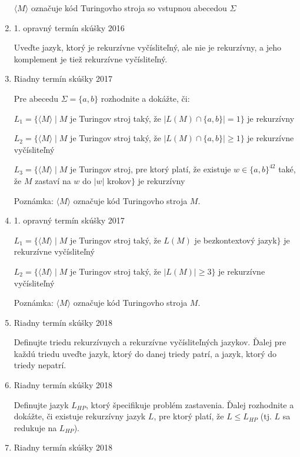 \documentclass[11pt,a4paper]{article}
\begin{document}
\begin{enumerate}
		$\langle M \rangle$ označuje kód Turingovho stroja so vstupnou abecedou $\Sigma$

		\item 1. opravný termín skúšky 2016

		Uveďte jazyk, ktorý je rekurzívne vyčísliteľný, ale nie je rekurzívny, a jeho komplement je tiež rekurzívne vyčísliteľný.

		\item Riadny termín skúšky 2017

		Pre abecedu $\Sigma = \{a, b\}$ rozhodnite a dokážte, či:

		$L_1 = \{\langle M \rangle \mid M$ je Turingov stroj taký, že $\vert L(M) \cap \{a,b\} \vert = 1\}$ je rekurzívny

		$L_2 = \{\langle M \rangle \mid M$ je Turingov stroj taký, že $\vert L(M) \cap \{a,b\} \vert \geq 1\}$ je rekurzívne vyčísliteľný

		$L_3 = \{\langle M \rangle \mid M$ je Turingov stroj, pre ktorý platí, že existuje $w \in \{a,b\}^{42}$ také, že $M$ zastaví na $w$ do $\vert w \vert$ krokov$\}$ je rekurzívny

		Poznámka: $\langle M \rangle$ označuje kód Turingovho stroja $M$.

		\item 1. opravný termín skúšky 2017

		$L_1 = \{\langle M \rangle \mid M$ je Turingov stroj taký, že $L(M)$ je bezkontextový jazyk$\}$ je rekurzívne vyčísliteľný

		$L_2 = \{\langle M \rangle \mid M$ je Turingov stroj taký, že $\vert L(M) \vert \geq 3\}$ je rekurzívne vyčísliteľný

		Poznámka: $\langle M \rangle$ označuje kód Turingovho stroja $M$.

		\item Riadny termín skúšky 2018

		Definujte triedu rekurzívnych a rekurzívne vyčísliteľných jazykov. Ďalej pre každú triedu uveďte jazyk, ktorý do danej triedy patrí, a jazyk, ktorý do triedy nepatrí.

		\item Riadny termín skúšky 2018

		Definujte jazyk $L_{HP}$, ktorý špecifikuje problém zastavenia. Ďalej rozhodnite a dokážte, či existuje rekurzívny jazyk $L$, pre ktorý platí, že $L \leq L_{HP}$ (tj. $L$ sa redukuje na $L_{HP}$).

		\item Riadny termín skúšky 2018


\end{enumerate}
\end{document}
